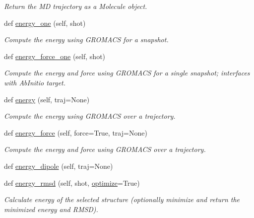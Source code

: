 \begin{DoxyCompactItemize}
\begin{DoxyCompactList}\small\item\em Return the MD trajectory as a Molecule object. \end{DoxyCompactList}\item 
def \hyperlink{classsrc_1_1gmxio_1_1GMX_ae025c413d18359468ccaeb5e86eaf130}{energy\+\_\+one} (self, shot)
\begin{DoxyCompactList}\small\item\em Compute the energy using G\+R\+O\+M\+A\+CS for a snapshot. \end{DoxyCompactList}\item 
def \hyperlink{classsrc_1_1gmxio_1_1GMX_a1d9129c7e9e4e081ee985256338ec663}{energy\+\_\+force\+\_\+one} (self, shot)
\begin{DoxyCompactList}\small\item\em Compute the energy and force using G\+R\+O\+M\+A\+CS for a single snapshot; interfaces with Ab\+Initio target. \end{DoxyCompactList}\item 
def \hyperlink{classsrc_1_1gmxio_1_1GMX_ab777a6e6ad8f1cfb8b7d3f5ced60838e}{energy} (self, traj=None)
\begin{DoxyCompactList}\small\item\em Compute the energy using G\+R\+O\+M\+A\+CS over a trajectory. \end{DoxyCompactList}\item 
def \hyperlink{classsrc_1_1gmxio_1_1GMX_afc3071aab6e7a737e0baada5f9b1f292}{energy\+\_\+force} (self, force=True, traj=None)
\begin{DoxyCompactList}\small\item\em Compute the energy and force using G\+R\+O\+M\+A\+CS over a trajectory. \end{DoxyCompactList}\item 
def \hyperlink{classsrc_1_1gmxio_1_1GMX_a19fc55e4c5bc5d3bf300070cdb1a49a7}{energy\+\_\+dipole} (self, traj=None)
\item 
def \hyperlink{classsrc_1_1gmxio_1_1GMX_ab545f644dac9947905b0b8c64d5f9c6d}{energy\+\_\+rmsd} (self, shot, \hyperlink{classsrc_1_1gmxio_1_1GMX_a92d0a874a4b720617b984cfb3f3117cf}{optimize}=True)
\begin{DoxyCompactList}\small\item\em Calculate energy of the selected structure (optionally minimize and return the minimized energy and R\+M\+SD). \end{DoxyCompactList}\item 

\end{DoxyCompactItemize}
